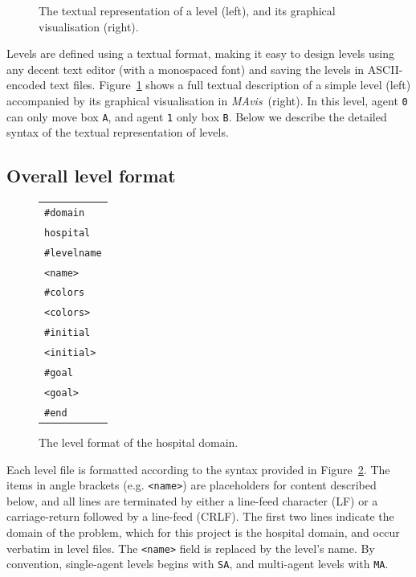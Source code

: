 \documentclass[12pt,a4paper]{article}
\def\mavis{{\itshape MAvis}}
\newcommand{\showlevel}[2]{%
    \scalebox{1}[.74]{%
        \begin{minipage}{#2}
            \renewcommand{\baselinestretch}{0.8}
            
            \renewcommand{\baselinestretch}{1.0}
        \end{minipage}
    }
}
\begin{document}
\begin{figure}
\begin{center}
    \scalebox{1.2}{\showlevel{levels/MAExample}{1.5cm}}
    \hspace{3cm}
\end{center}
\caption{The textual representation of a level (left), and its graphical visualisation (right).}\label{figu:textual}
\end{figure}
Levels are defined using a textual format, making it easy to design levels using any decent text editor (with a monospaced font) and saving the levels in ASCII-encoded text files. Figure~\ref{figu:textual} shows a full textual description of a simple level (left) accompanied by its graphical visualisation in \mavis\ (right). In this level, agent \texttt{0} can only move box \texttt{A}, and agent \texttt{1} only box \texttt{B}. Below we describe the detailed syntax of the textual representation of levels. 

\subsection{Overall level format} 
\begin{figure}
\begin{center}
\begin{tabular}{l}
\verb|#domain| \\
\verb|hospital| \\
\verb|#levelname| \\
\verb|<name>| \\
\verb|#colors| \\
\verb|<colors>| \\
\verb|#initial| \\
\verb|<initial>| \\
\verb|#goal| \\
\verb|<goal>| \\
\verb|#end| 
\end{tabular}
\end{center}
\caption{The level format of the hospital domain.}\label{figu:level-format}
\end{figure}
Each level file is formatted according to the syntax provided in Figure~\ref{figu:level-format}.
The items in angle brackets (e.g. \texttt{<name>}) are placeholders for content described below, and all lines are terminated by either a line-feed character (LF) or a carriage-return followed by a line-feed (CRLF).
The first two lines indicate the domain of the problem, which for this project is the hospital domain, and occur verbatim in level files. The \texttt{<name>} field is replaced by the level's name. By convention, single-agent levels begins with \texttt{SA}, and multi-agent levels with \texttt{MA}.
\end{document}
